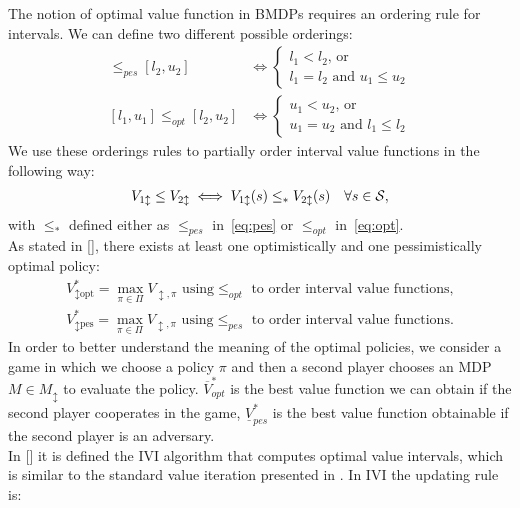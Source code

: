 \newline
The notion of optimal value function in \ac{BMDP}s requires an ordering rule for intervals. We can define two different possible orderings:
\begin{align}
[l_1, u_1] \leq_{pes} [l_2, u_2] &\Leftrightarrow 
\begin{cases}
l_1 < l_2 \text{, or }\\
l_1 = l_2 \text{ and } u_1 \leq u_2
\end{cases} \label{eq:pes}\\
[l_1, u_1] \leq_{opt} [l_2, u_2] &\Leftrightarrow 
\begin{cases}
u_1 < u_2 \text{, or }\\
u_1 = u_2 \text{ and } l_1 \leq l_2
\end{cases} \label{eq:opt}
\end{align}
We use these orderings rules to partially order interval value functions in the following way:
\begin{align} V_{1 \updownarrow} \leq V_{2 \updownarrow} \iff V_{1 \updownarrow}(s) \leq_{*} V_{2 \updownarrow}(s) \quad \forall s \in \mathcal{S}, \end{align}
with $\leq_{*}$ defined either as $\leq_{pes}$ in~\eqref{eq:pes} or $\leq_{opt}$ in~\eqref{eq:opt}.\\
\newline
As stated in [\cite{givan2000bounded}], there exists at least one optimistically and one pessimistically optimal policy:
\begin{align*}
V^{*}_{\updownarrow \text{opt}} = \max_{\pi \in \Pi} V_{\updownarrow, \pi} \text{ using} \leq_{opt} \text{ to order interval value functions,}\\
V^{*}_{\updownarrow \text{pes}} = \max_{\pi \in \Pi} V_{\updownarrow, \pi} \text{ using} \leq_{pes} \text{ to order interval value functions.}
\end{align*}
In order to better understand the meaning of the optimal policies, we consider a game in which we choose a policy $\pi$ and then a second player chooses an \ac{MDP} $M \in M_{\updownarrow}$ to evaluate the policy. $\overline{V}^{*}_{opt}$ is the best value function we can obtain if the second player cooperates in the game, $\underline{V}^{*}_{pes}$ is the best value function obtainable if the second player is an adversary.\\
\newline
In [\cite{givan2000bounded}] it is defined the \acf{IVI} algorithm that computes optimal value intervals, which is similar to the standard value iteration presented in . In \ac{IVI} the updating rule is:
